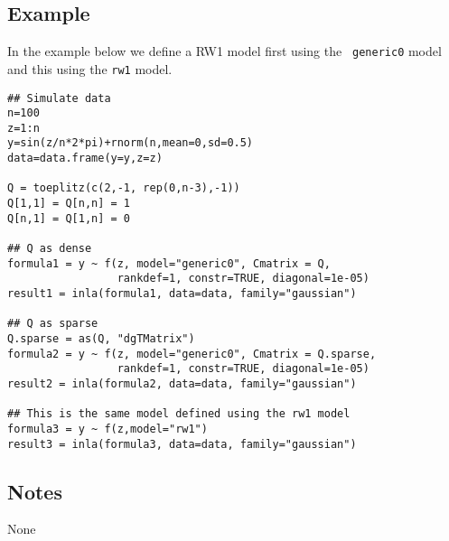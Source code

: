 \documentclass[a4paper,11pt]{article}
\begin{document}
\subsection*{Example}
In the example below we define a RW1 model first using the {\tt
    generic0} model and this using the {\tt rw1} model.
\begin{verbatim}
## Simulate data
n=100
z=1:n
y=sin(z/n*2*pi)+rnorm(n,mean=0,sd=0.5)
data=data.frame(y=y,z=z)

Q = toeplitz(c(2,-1, rep(0,n-3),-1))
Q[1,1] = Q[n,n] = 1
Q[n,1] = Q[1,n] = 0

## Q as dense
formula1 = y ~ f(z, model="generic0", Cmatrix = Q,
                 rankdef=1, constr=TRUE, diagonal=1e-05)
result1 = inla(formula1, data=data, family="gaussian")

## Q as sparse
Q.sparse = as(Q, "dgTMatrix")
formula2 = y ~ f(z, model="generic0", Cmatrix = Q.sparse,
                 rankdef=1, constr=TRUE, diagonal=1e-05)
result2 = inla(formula2, data=data, family="gaussian")

## This is the same model defined using the rw1 model
formula3 = y ~ f(z,model="rw1")
result3 = inla(formula3, data=data, family="gaussian")
\end{verbatim}

\subsection*{Notes}
None
\end{document}
